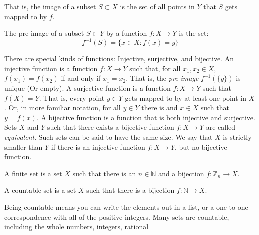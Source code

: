 \documentclass[crop=false,class=book,oneside]{standalone}
\begin{document}
            That is, the image of a subset $S\subset{X}$
            is the set of all points in $Y$ that $S$ gets
            mapped to by $f$.
            \begin{definition}
                The pre-image of a subset
                $S\subset{Y}$ by a function
                $f:X\rightarrow{Y}$ is the set:
                \begin{equation*}
                    f^{-1}(S)
                    =\{x\in{X}:f(x)=y\}
                \end{equation*}
            \end{definition}
            There are special kinds of functions: Injective,
            surjective, and bijective. An injective
            function is a function $f:X\rightarrow{Y}$ such
            that, for all $x_{1},x_{2}\in{X}$,
            $f(x_{1})=f(x_{2})$ if and only if $x_{1}=x_{2}$.
            That is, the \textit{pre-image} $f^{-1}(\{y\})$
            is unique (Or empty). A
            surjective function is a function $f:X\rightarrow{Y}$
            such that $f(X)=Y$. That is, every point $y\in{Y}$
            gets mapped to by at least one point in $X$. Or, in
            more familiar notation, for all $y\in{Y}$ there is
            and $x\in{X}$ such that $y=f(x)$. A bijective
            function is a function that is both injective and
            surjective. Sets $X$ and $Y$ such that there
            exists a bijective function $f:X\rightarrow{Y}$ are
            called \textit{equivalent}. Such sets can be said
            to have the same size. We say that $X$ is strictly
            smaller than $Y$ if there is an injective function
            $f:X\rightarrow{Y}$, but no bijective function.
            \begin{definition}
                A finite set is a set $X$ such that there is
                an $n\in\mathbb{N}$ and a bijection
                $f:\mathbb{Z}_{n}\rightarrow{X}$.
            \end{definition}
            \begin{definition}
                A countable set is a set
                $X$ such that there is a bijection
                $f:\mathbb{N}\rightarrow{X}$.
            \end{definition}
            Being countable means you can write
            the elements out in a list, or a
            one-to-one correspondence with all of
            the positive integers. Many sets are countable,
            including the whole numbers, integers, rational
\end{document}
